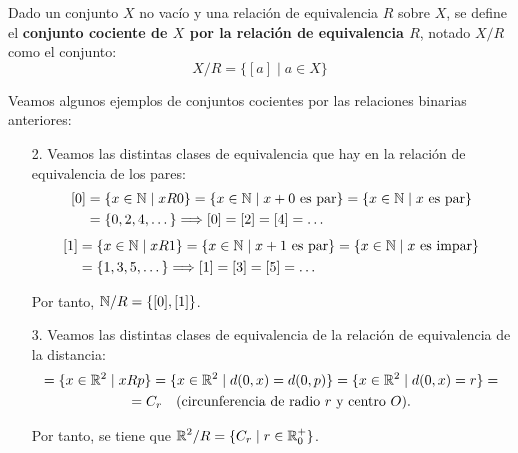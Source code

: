 \begin{definicion}
    Dado un conjunto $X$ no vacío y una relación de equivalencia $R$ sobre $X$, se define el
    \textbf{conjunto cociente de $X$ por la relación de equivalencia $R$}, notado $X/R$ como el conjunto:
    $$X/R = \{[a] \mid a \in X\}$$
\end{definicion}

\begin{ejemplo} Veamos algunos ejemplos de conjuntos cocientes por las relaciones binarias anteriores:
\begin{enumerate}
    \item[2.] Veamos las distintas clases de equivalencia que hay en la relación de equivalencia de los pares:
    \begin{equation*}
        \begin{split}
            [0] &= \{x\in \mathbb{N} \mid xR0\} = \{x\in \mathbb{N}\mid x+0 \text{ es par}\} = \{x\in \mathbb{N}\mid x \text{ es par}\} \\&= \{0,2,4,\dots\} \Longrightarrow [0]=[2]=[4]=\dots
        \end{split}
    \end{equation*}
    \begin{equation*}
        \begin{split}
            [1] &= \{x\in \mathbb{N} \mid xR1\} = \{x\in \mathbb{N}\mid x+1 \text{ es par}\} = \{x\in \mathbb{N}\mid x \text{ es impar}\} \\&= \{1,3,5,\dots\} \Longrightarrow [1]=[3]=[5]=\dots
        \end{split}
    \end{equation*}

    Por tanto, $\displaystyle \mathbb{N}/R = \{[0],[1]\}$.

    \item[3.] Veamos las distintas clases de equivalencia de la relación de equivalencia de la distancia:
    \begin{multline*}
        [p] = \{x\in \bb{R}^2\mid xRp\} = \{x\in \bb{R}^2\mid d(0,x)=d(0,p)\} = \{x\in \bb{R}^2\mid d(0,x)=r\} =\\= C_r \quad \text{(circunferencia de radio $r$ y centro $O$)}.
    \end{multline*}

    Por tanto, se tiene que $\displaystyle \mathbb{R}^2/R = \{C_r\mid r\in \mathbb{R}^+_0\}$.
\end{enumerate}
\end{ejemplo}

